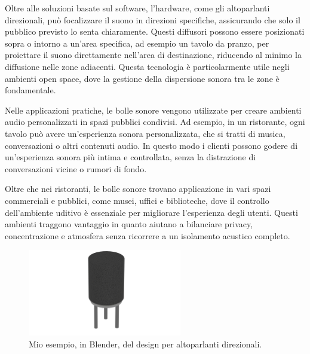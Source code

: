 Oltre alle soluzioni basate sul software, l'hardware, come gli altoparlanti direzionali, può focalizzare il suono in direzioni specifiche, assicurando che solo il pubblico previsto lo senta chiaramente. Questi diffusori possono essere posizionati sopra o intorno a un'area specifica, ad esempio un tavolo da pranzo, per proiettare il suono direttamente nell'area di destinazione, riducendo al minimo la diffusione nelle zone adiacenti. Questa tecnologia è particolarmente utile negli ambienti open space, dove la gestione della dispersione sonora tra le zone è fondamentale.

Nelle applicazioni pratiche, le bolle sonore vengono utilizzate per creare ambienti audio personalizzati in spazi pubblici condivisi. Ad esempio, in un ristorante, ogni tavolo può avere un'esperienza sonora personalizzata, che si tratti di musica, conversazioni o altri contenuti audio. In questo modo i clienti possono godere di un'esperienza sonora più intima e controllata, senza la distrazione di conversazioni vicine o rumori di fondo. 

Oltre che nei ristoranti, le bolle sonore trovano applicazione in vari spazi commerciali e pubblici, come musei, uffici e biblioteche, dove il controllo dell'ambiente uditivo è essenziale per migliorare l'esperienza degli utenti. Questi ambienti traggono vantaggio in quanto aiutano a bilanciare privacy, concentrazione e atmosfera senza ricorrere a un isolamento acustico completo. \cite{cit-multiaudio}

\begin{figure}[H]
      \centering
      \includegraphics[width=0.6\textwidth]{Chapters/Figures/render_speaker.png}
      \caption{\small Mio esempio, in Blender, del design per altoparlanti direzionali.}
      \label{fig:RT60}
\end{figure}